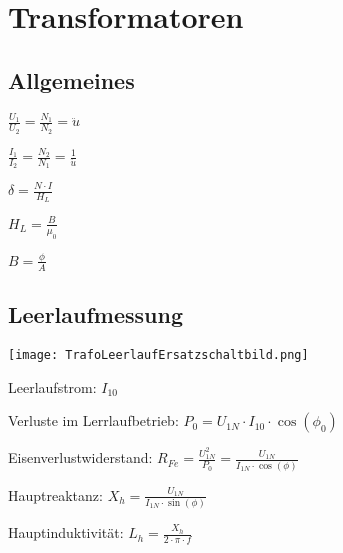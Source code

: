 \documentclass[german]{latex4ei/latex4ei_sheet}
\begin{document}
	\section{Transformatoren}
		\begin{sectionbox}
			\subsection{Allgemeines}
				\begin{bluebox}
					\item $\frac{U_1}{U_2} = \frac{N_1}{N_2} = \ddot{u} $
					\item $\frac{I_1}{I_2} = \frac{N_2}{N_1} = \frac{1}{\ddot{u} }$
					\item $\delta = \frac{N\cdot I}{H_L}$
					\item $H_L = \frac{B}{\mu_0}$
					\item $B = \frac{\phi}{A}$
				\end{bluebox}

			\subsection{Leerlaufmessung}
				\texttt{[image: TrafoLeerlaufErsatzschaltbild.png]}
				\begin{symbolbox}
					\item Leerlaufstrom: $I_{10}$
					\item Verluste im Lerrlaufbetrieb: $P_0 = U_{1N}\cdot I_{10} \cdot \cos(\phi_0)$
					\item Eisenverlustwiderstand: $R_{Fe} = \frac{U_{1N}^2}{P_0} = \frac{U_{1N}}{I_{1N}\cdot \cos(\phi)}$
					\item Hauptreaktanz: $X_h = \frac{U_{1N}}{I_{1N}\cdot \sin(\phi)}$
					\item Hauptinduktivität: $L_h = \frac{X_h}{2\cdot \pi \cdot f}$
				\end{symbolbox}
		\end{sectionbox}
\end{document}
